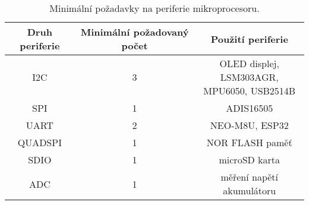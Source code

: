 \begin{table}[ht]
\centering
\begin{tabular}{|c|c|c|}
\hline 
Druh periferie & Minimální požadovaný počet & Použití periferie \\ 
\hline 
\hline 
I2C & 3 & \makecell{OLED displej, LSM303AGR, \\MPU6050, USB2514B}  \\ 
\hline 
SPI & 1 & ADIS16505 \\ 
\hline 
UART & 2 & NEO-M8U, ESP32 \\ 
\hline 
QUADSPI & 1 & NOR FLASH paměť \\ 
\hline 
SDIO & 1 & microSD karta \\ 
\hline 
ADC & 1 & měření napětí akumulátoru \\ 
\hline 
\end{tabular} 

\caption{Minimální požadavky na periferie mikroprocesoru.} 
\label{table:MCUperiferie}
\end{table} 
